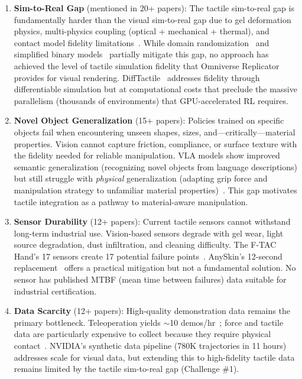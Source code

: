 \begin{enumerate}
    \item \textbf{Sim-to-Real Gap} (mentioned in 20+ papers): The tactile sim-to-real gap is fundamentally harder than the visual sim-to-real gap due to gel deformation physics, multi-physics coupling (optical + mechanical + thermal), and contact model fidelity limitations~\cite{handa2023dextreme,openai2020dactyl,si2024difftactile}. While domain randomization~\cite{handa2023dextreme} and simplified binary models~\cite{yin2024tactile} partially mitigate this gap, no approach has achieved the level of tactile simulation fidelity that Omniverse Replicator provides for visual rendering. DiffTactile~\cite{si2024difftactile} addresses fidelity through differentiable simulation but at computational costs that preclude the massive parallelism (thousands of environments) that GPU-accelerated RL requires.

    \item \textbf{Novel Object Generalization} (15+ papers): Policies trained on specific objects fail when encountering unseen shapes, sizes, and---critically---material properties. Vision cannot capture friction, compliance, or surface texture with the fidelity needed for reliable manipulation. VLA models show improved semantic generalization (recognizing novel objects from language descriptions) but still struggle with \emph{physical} generalization (adapting grip force and manipulation strategy to unfamiliar material properties)~\cite{kim2024openvla,black2024pi0,google2025gemini}. This gap motivates tactile integration as a pathway to material-aware manipulation.

    \item \textbf{Sensor Durability} (12+ papers): Current tactile sensors cannot withstand long-term industrial use. Vision-based sensors degrade with gel wear, light source degradation, dust infiltration, and cleaning difficulty. The F-TAC Hand's 17 sensors create 17 potential failure points~\cite{zhao2025ftac}. AnySkin's 12-second replacement~\cite{bhirangi2024anyskin} offers a practical mitigation but not a fundamental solution. No sensor has published MTBF (mean time between failures) data suitable for industrial certification.

    \item \textbf{Data Scarcity} (12+ papers): High-quality demonstration data remains the primary bottleneck. Teleoperation yields $\sim$10 demos/hr~\cite{wang2024dexcap}; force and tactile data are particularly expensive to collect because they require physical contact~\cite{chen2025dexforce}. NVIDIA's synthetic data pipeline (780K trajectories in 11 hours)~\cite{nvidia2025synthetic} addresses scale for visual data, but extending this to high-fidelity tactile data remains limited by the tactile sim-to-real gap (Challenge \#1).


\end{enumerate}
